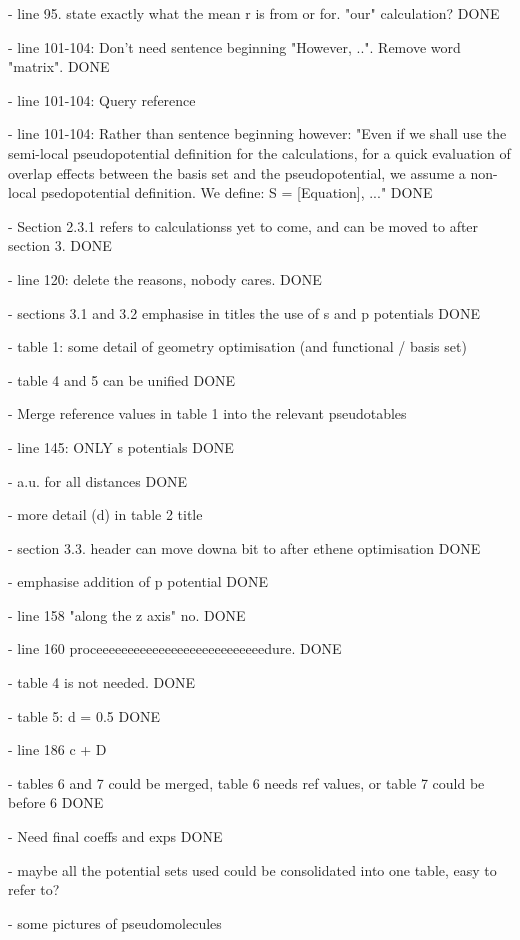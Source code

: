 \documentclass[journal=jctcce,manuscript=article]{achemso}
\begin{document}
- line 95. state exactly what the mean r is from or for. "our" calculation? DONE

- line 101-104: Don't need sentence beginning "However, ..". Remove word "matrix". DONE

- line 101-104: Query reference

- line 101-104: Rather than sentence beginning however: "Even if we shall use the semi-local pseudopotential definition for the calculations, for a 
quick evaluation of overlap effects between the basis set and the pseudopotential, we assume a non-local psedopotential definition. We define: S = [Equation], ..." DONE

- Section 2.3.1 refers to calculationss yet to come, and can be moved to after section 3. DONE

- line 120: delete the reasons, nobody cares. DONE

- sections 3.1 and 3.2 emphasise in titles the use of s and p potentials DONE

- table 1: some detail of geometry optimisation (and functional / basis set)

- table 4 and 5 can be unified DONE

- Merge reference values in table 1 into the relevant pseudotables

- line 145: ONLY s potentials DONE

- a.u. for all distances DONE

- more detail (d) in table 2 title

- section 3.3. header can move downa  bit to after ethene optimisation DONE

- emphasise addition of p potential DONE

- line 158 "along the z axis" no. DONE

- line 160 proceeeeeeeeeeeeeeeeeeeeeeeeeeedure. DONE

- table 4 is not needed. DONE

- table 5: d = 0.5 DONE

- line 186 c + D

- tables 6 and 7 could be merged, table 6 needs ref values, or table 7 could be before 6 DONE

- Need final coeffs and exps DONE

- maybe all the potential sets used could be consolidated into one table, easy to refer to?

- some pictures of pseudomolecules
\end{document}
